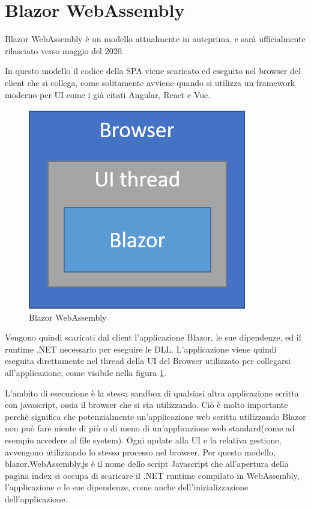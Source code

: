 \pagebreak

\section{Blazor WebAssembly}\label{sez:bwa}
Blazor WebAssembly \`e un modello attualmente in anteprima, e sar\`a ufficialmente rilasciato verso maggio del 2020.

In questo modello il codice della SPA viene scaricato ed eseguito nel browser del client che si collega, come solitamente avviene quando si utilizza un framework moderno per UI come i gi\`a citati Angular, React e Vue.

\begin{figure}[H]
	\centerline{\includegraphics[scale=0.6]{figure/blazor-WebAssembly.png}}
	\caption{Blazor WebAssembly}
	\label{fig:BlazorWebAssembly}
\end{figure}

Vengono quindi scaricati dal client l'applicazione Blazor, le sue dipendenze, ed il runtime .NET necessario per eseguire le DLL.
L'applicazione viene quindi eseguita direttamente nel thread della UI del Browser utilizzato per collegarsi all'applicazione, come visibile nella figura \ref{fig:BlazorWebAssembly}.

L'ambito di esecuzione \`e la stessa sandbox di qualsiasi altra applicazione scritta con javascript, ossia il browser che si sta utilizzando.
Ci\`o \`e molto importante perch\`e significa che potenzialmente un'applicazione web scritta utilizzando Blazor non pu\`o fare niente di pi\`u o di meno di un'applicazione web standard(come ad esempio accedere al file system).
Ogni update alla UI e la relativa gestione, avvengono utilizzando lo stesso processo nel browser.
Per questo modello, blazor.WebAssembly.js \`e il nome dello script Javascript che all'apertura della pagina index si occupa di scaricare il .NET runtime compilato in WebAssembly, l'applicazione e le sue dipendenze, come anche dell'inizializzazione dell'applicazione.

